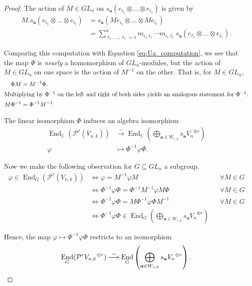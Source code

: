 \documentclass[10pt]{amsart}
\theoremstyle{definition}
\theoremstyle{definition}
\theoremstyle{plain}
\theoremstyle{remark}
\theoremstyle{plain}
\theoremstyle{plain}
\newcommand{\C}{\mathbb{C}}
\newcommand{\PP}{\mathcal{P}}
\newcommand{\bfa}{{\boldsymbol{a}}}
\DeclareMathOperator{\End}{End}
\begin{document}
\begin{proof}
The action of $M\in GL_n$ on $s_\bfa(e_{i_1}\otimes\dots\otimes e_{i_r})$ is given by \begin{align*}
    M.s_\bfa(e_{i_1}\otimes\dots\otimes e_{i_r})&=s_\bfa(Me_{i_1}\otimes\dots\otimes M e_{i_r})\\
    &=\sum_{\ell_1,\dots,\ell_r=1}^n m_{i_1\ell_r}\cdots m_{i_r\ell_r}s_\bfa(e_{\ell_1}\otimes\dots\otimes e_{\ell_r}).
\end{align*}

Comparing this computation with Equation \ref{eq:Ua_computation}, we see that the map $\Phi$ is \textit{nearly} a homomorphism of $GL_n$-modules, but the action of $M\in GL_n$ on one space is the action of $M^{-1}$ on the other. That is, for $M\in GL_n$, \begin{align*}
        \Phi M &= M^{-1}\Phi.\\
        \intertext{Multiplying by $\Phi^{-1}$ on the left and right of both sides yields an analogous statement for $\Phi^{-1}$:}
        M\Phi^{-1}&=\Phi^{-1}M^{-1}.
    \end{align*}


    The linear isomorphism $\Phi$ induces an algebra isomorphism \begin{align*}
        \End_\C(\PP^r(V_{n,k}))&\stackrel{\sim}{\longrightarrow}\End_\C\left(\bigoplus_{\bfa\in W_{r,k}}s_\bfa{V_n}^{\otimes r}\right)\\
        \varphi&\longmapsto \Phi^{-1}\varphi\Phi.
    \end{align*}
    
     Now we make the following observation for $G\subseteq GL_n$ a subgroup. \begin{align*}
        \varphi\in\End_G(\PP^r(V_{n,k}))&\iff \varphi=M^{-1}\varphi M && \forall M\in G\\
        &\iff \Phi^{-1}\varphi\Phi=\Phi^{-1} M^{-1} \varphi M \Phi && \forall M\in G\\
        &\iff \Phi^{-1}\varphi\Phi=M\Phi^{-1}\varphi\Phi M^{-1} && \forall M\in G\\
        &\iff \Phi^{-1}\varphi\Phi\in\End_G\left(\bigoplus_{\bfa\in W_{r,k}}s_\bfa{V_n}^{\otimes r}\right)
    \end{align*}

    Hence, the map $\varphi\mapsto \Phi^{-1}\varphi\Phi$ restricts to an isomorphism\[\End_G(\PP^r{V_{n,k}}^{\otimes r})\stackrel{\sim}{\longrightarrow}\End_G\left(\bigoplus_{\bfa\in W_{r,k}}s_\bfa {V_n}^{\otimes r}\right). \qedhere\]
\end{proof}
\end{document}
